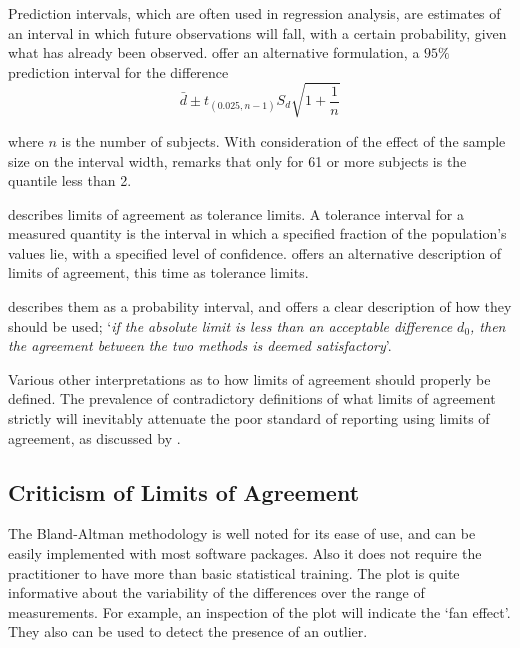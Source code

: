 \documentclass[12pt, a4paper]{report}
\theoremstyle{plain}
\theoremstyle{definition}
\theoremstyle{remark}
\begin{document}
Prediction intervals, which are often used in regression analysis, are estimates of an interval in which future
observations will fall, with a certain probability, given what has already been observed. \citet{BXC2008} offer an alternative
formulation, a $95\%$ prediction interval for the difference
\begin{equation}
\bar{d} \pm t_{(0.025, n-1)}S_{d} \sqrt{1+\frac{1}{n}}
\end{equation}

 where $n$ is the number of subjects. With consideration of the effect of the sample size on the interval
width, \citet{BXC2008} remarks that only for 61 or more subjects is the quantile less than 2.

\citet{luiz} describes limits of agreement as tolerance limits. A
tolerance interval for a measured quantity is the interval in
which a specified fraction of the population's values lie, with a
specified level of confidence. \citet{luiz} offers an alternative description of limits of agreement, this time as tolerance limits. 

\citet{Barnhart} describes them as a probability interval, and offers a clear description of how they should be used; `\textit{if the absolute limit is less than an acceptable difference $d_{0}$, then the agreement between the two methods is deemed satisfactory}'.

Various other interpretations as to how limits of agreement should properly be defined. The prevalence of contradictory definitions of what limits of agreement strictly will inevitably attenuate the poor standard of reporting using limits of agreement, as discussed by \citet{mantha}.



\subsection{Criticism of Limits of Agreement }
The Bland-Altman methodology is well noted for its ease of use, and can be easily implemented with most software packages. Also it does not require the practitioner to have more than basic statistical training. The plot is quite informative about the variability of the differences over the range of measurements. For
example, an inspection of the plot will indicate the `fan effect'. They also can be used to detect the presence of an outlier.
\end{document}

